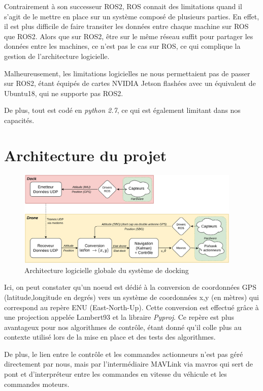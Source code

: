 \documentclass[12pt]{report}
\begin{document}
Contrairement à son successeur ROS2, ROS connait des limitations quand il s'agit de le mettre en place
sur un système composé de plusieurs parties. En effet, il est plus difficile de faire transiter les données
entre chaque machine sur ROS que ROS2. Alors que sur ROS2, être sur le même réseau suffit pour partager
les données entre les machines, ce n'est pas le cas sur ROS, ce qui complique la gestion de l'architecture
logicielle.

Malheureusement, les limitations logicielles ne nous permettaient pas de passer sur ROS2, étant équipés de
cartes NVIDIA Jetson flashées avec un équivalent de Ubuntu18, qui ne supporte pas ROS2.

De plus, tout est codé en \textit{python 2.7}, ce qui est également limitant dans nos capacités.

\section{Architecture du projet}

\begin{figure}[H]
    \centering
    \includegraphics[width=0.95\textwidth]{imgs/schema_general.png}
    \caption{Architecture logicielle globale du système de docking}
    \label{fig:schema_general}
\end{figure}

Ici, on peut constater qu'un noeud est dédié à la conversion de coordonnées GPS (latitude,longitude
en degrés) vers un système de coordonnées x,y (en mètres) qui correspond au repère ENU (East-North-Up).
Cette conversion est effectué grâce à une projection appelée Lambert93 et la libraire \textit{Pyproj}.
Ce repère est plus avantageux pour nos algorithmes de contrôle, étant donné qu'il colle plus au contexte
utilisé lors de la mise en place et des tests des algorithmes.

De plus, le lien entre le contrôle et les commandes actionneurs n'est pas géré directement par nous, mais
par l'intermédiaire MAVLink via mavros qui sert de pont et d'interpréteur entre les commandes en vitesse
du véhicule et les commandes moteurs.
\end{document}
